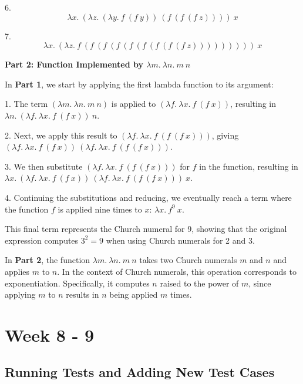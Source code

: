 \documentclass{article}
\theoremstyle{theorem}
\theoremstyle{definition}
\theoremstyle{remark}
\begin{document}
6. \[
\lambda x.\ \left( \lambda z.\ \left( \lambda y.\ f\ (f\ y) \right)\ \left( f\ \left( f\ \left( f\ z \right) \right) \right) \right)\ x
\]

7. \[
\lambda x.\ \left( \lambda z.\ f\ \left( f\ \left( f\ \left( f\ \left( f\ \left( f\ \left( f\ \left( f\ \left( f\ z \right) \right) \right) \right) \right) \right) \right) \right) \right)\ x
\]

\textbf{Part 2: Function Implemented by \(\lambda m.\ \lambda n.\ m\ n\)}

In \textbf{Part 1}, we start by applying the first lambda function to its argument:

1. The term \(\left( \lambda m.\ \lambda n.\ m\ n \right)\) is applied to \(\left( \lambda f.\ \lambda x.\ f\ (f\ x) \right)\), resulting in \(\lambda n.\ \left( \lambda f.\ \lambda x.\ f\ (f\ x) \right)\ n\).

2. Next, we apply this result to \(\left( \lambda f.\ \lambda x.\ f\ \left( f\ \left( f\ x \right) \right) \right)\), giving \(\left( \lambda f.\ \lambda x.\ f\ (f\ x) \right)\ \left( \lambda f.\ \lambda x.\ f\ \left( f\ \left( f\ x \right) \right) \right)\).

3. We then substitute \(\left( \lambda f.\ \lambda x.\ f\ \left( f\ \left( f\ x \right) \right) \right)\) for \(f\) in the function, resulting in \(\lambda x.\ \left( \lambda f.\ \lambda x.\ f\ (f\ x) \right)\ \left( \lambda f.\ \lambda x.\ f\ \left( f\ \left( f\ x \right) \right) \right)\ x\).

4. Continuing the substitutions and reducing, we eventually reach a term where the function \(f\) is applied nine times to \(x\): \(\lambda x.\ f^{9}\ x\).

This final term represents the Church numeral for 9, showing that the original expression computes \(3^2 = 9\) when using Church numerals for 2 and 3.

In \textbf{Part 2}, the function \(\lambda m.\ \lambda n.\ m\ n\) takes two Church numerals \(m\) and \(n\) and applies \(m\) to \(n\). In the context of Church numerals, this operation corresponds to exponentiation. Specifically, it computes \(n\) raised to the power of \(m\), since applying \(m\) to \(n\) results in \(n\) being applied \(m\) times.


\section{Week 8 - 9}

\subsection{Running Tests and Adding New Test Cases}
\end{document}
